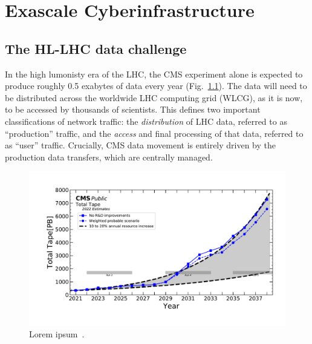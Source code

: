\chapter{Exascale Cyberinfrastructure}

\section{The HL-LHC data challenge}
In the high lumonisty era of the LHC, the CMS experiment alone is expected to produce roughly 0.5 exabytes of data every year (Fig.~\ref{fig:tape_projections}). 
The data will need to be distributed across the worldwide LHC computing grid (WLCG), as it is now, to be accessed by thousands of scientists. 
This defines two important classifications of network traffic: the \textit{distribution} of LHC data, referred to as ``production'' traffic, and the \textit{access} and final processing of that data, referred to as ``user'' traffic. 
Crucially, CMS data movement is entirely driven by the production data transfers, which are centrally managed. 

\begin{figure}[htb]
  \centering
  \includegraphics[width=.9\textwidth]{fig/cyber/tape_cms2022.pdf}
  \caption{Lorem ipsum~\cite{CMSComputingReport2022}.}
  \label{fig:tape_projections}
\end{figure}

